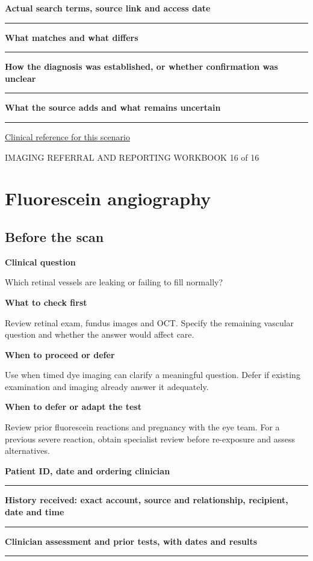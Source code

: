 \documentclass[11pt,a4paper]{article}
\newcommand{\record}[1]{\textbf{#1}\par\vspace{0.55\baselineskip}\hrule\vspace{0.35\baselineskip}}
\begin{document}
\record{Actual search terms, source link and access date}

\record{What matches and what differs}

\record{How the diagnosis was established, or whether confirmation was unclear}

\record{What the source adds and what remains uncertain}

\small\href{https://www.aaojournal.org/article/S0161-6420(19)32902-5/fulltext/}{Clinical reference for this scenario}

\normalsize

\newpage

{\small IMAGING REFERRAL AND REPORTING WORKBOOK \hfill 16 of 16}

\section*{Fluorescein angiography}

\subsection*{Before the scan}

\textbf{Clinical question}\par Which retinal vessels are leaking or failing to fill normally?\par

\textbf{What to check first}\par Review retinal exam, fundus images and OCT. Specify the remaining vascular question and whether the answer would affect care.\par

\textbf{When to proceed or defer}\par Use when timed dye imaging can clarify a meaningful question. Defer if existing examination and imaging already answer it adequately.\par

\textbf{When to defer or adapt the test}\par Review prior fluorescein reactions and pregnancy with the eye team. For a previous severe reaction, obtain specialist review before re-exposure and assess alternatives.\par

\record{Patient ID, date and ordering clinician}

\record{History received: exact account, source and relationship, recipient, date and time}

\record{Clinician assessment and prior tests, with dates and results}
\end{document}
